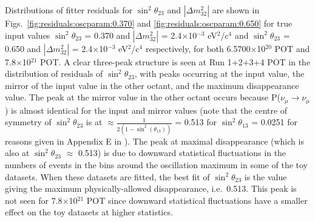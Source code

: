 Distributions of fitter residuals for $\sin^{2}\theta_{23}$ and $|\Delta m^{2}_{32}|$ are shown in
Figs.\ \ref{fig:residuals:oscparam:0.370} and \ref{fig:residuals:oscparam:0.650}
for true input values $\sin^{2}\theta_{23}$ = 0.370 and $|\Delta m^{2}_{32}|$ = 2.4$\times$10$^{-3}$ eV$^{2}$/c$^{4}$
and $\sin^{2}\theta_{23}$ = 0.650 and $|\Delta m^{2}_{32}|$ = 2.4$\times$10$^{-3}$ eV$^{2}$/c$^{4}$
respectively, for both 6.5700$\times$10$^{20}$ POT and 7.8$\times$10$^{21}$ POT. A clear three-peak structure is seen 
at Run 1+2+3+4 POT in the distribution of residuals of $\sin^{2}\theta_{23}$, with peaks occurring at
the input value, the mirror of the input value in the other octant, and the maximum disappearance value. 
The peak at the mirror value in the other octant occurs because P($\nu_{\mu} \rightarrow \nu_{\mu}$) is almost identical 
for the input and mirror values (note that the centre of symmetry of $\sin^{2}\theta_{23}$ is at 
$\approx \frac{1}{2(1-\sin^{2}(\theta_{13}))}$ = 0.513 for $\sin^{2}\theta_{13}$ = 0.0251 for reasons given in Appendix E in 
\cite{OurRun123JointOscillationAnalysis}). 
The peak at maximal disappearance (which is also at $\sin^{2}\theta_{23}$ $\approx$
0.513) is due to downward statistical fluctuations in the numbers of events in the bins around the oscillation maximum in some
of the toy datasets. When these datasets are fitted, the best fit of $\sin^{2}\theta_{23}$ is the value giving the maximum
physically-allowed disappearance, i.e.\ 0.513. This peak is not seen for 7.8$\times$10$^{21}$ POT since downward statistical 
fluctuations have a smaller effect on the toy datasets at higher statistics. 

